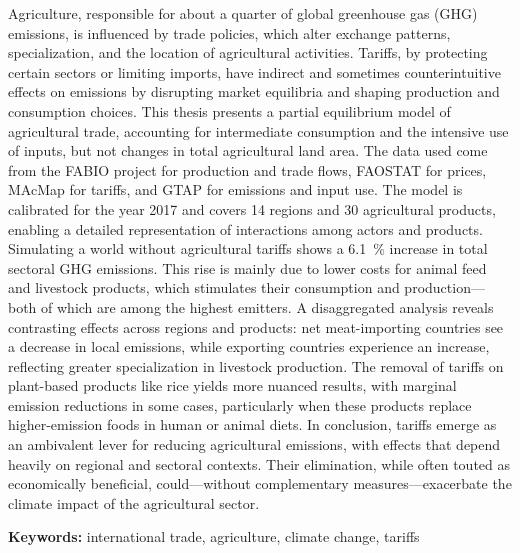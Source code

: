 
Agriculture, responsible for about a quarter of global greenhouse gas (GHG) emissions, is influenced by trade policies, which alter exchange patterns, specialization, and the location of agricultural activities. Tariffs, by protecting certain sectors or limiting imports, have indirect and sometimes counterintuitive effects on emissions by disrupting market equilibria and shaping production and consumption choices. This thesis presents a partial equilibrium model of agricultural trade, accounting for intermediate consumption and the intensive use of inputs, but not changes in total agricultural land area. The data used come from the FABIO project for production and trade flows, FAOSTAT for prices, MAcMap for tariffs, and GTAP for emissions and input use. The model is calibrated for the year 2017 and covers 14 regions and 30 agricultural products, enabling a detailed representation of interactions among actors and products.
Simulating a world without agricultural tariffs shows a 6.1~\% increase in total sectoral GHG emissions. This rise is mainly due to lower costs for animal feed and livestock products, which stimulates their consumption and production—both of which are among the highest emitters. A disaggregated analysis reveals contrasting effects across regions and products: net meat-importing countries see a decrease in local emissions, while exporting countries experience an increase, reflecting greater specialization in livestock production. The removal of tariffs on plant-based products like rice yields more nuanced results, with marginal emission reductions in some cases, particularly when these products replace higher-emission foods in human or animal diets.
In conclusion, tariffs emerge as an ambivalent lever for reducing agricultural emissions, with effects that depend heavily on regional and sectoral contexts. Their elimination, while often touted as economically beneficial, could—without complementary measures—exacerbate the climate impact of the agricultural sector.

\textbf{Keywords:} international trade, agriculture, climate change, tariffs
